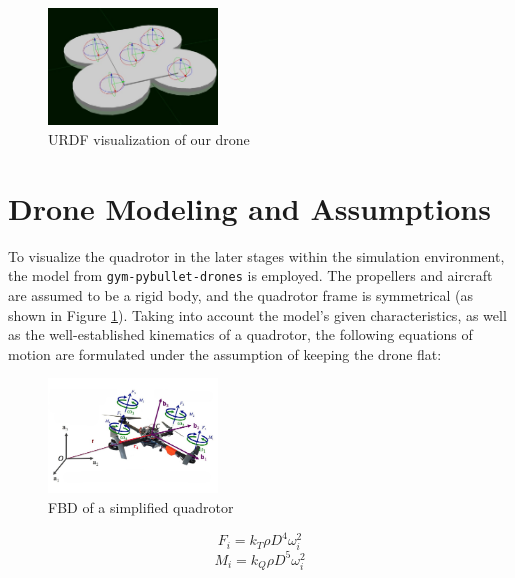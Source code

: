 \documentclass[a4paper, 11pt, conference]{ieeeconf}      %
\begin{document}
\begin{figure}[!h]
    \centering
    \includegraphics[width=0.4\textwidth]{drone_urdf_mockup.jpg}
    \caption{URDF visualization of our drone \cite{mmyself_ros_ardrone}}
    \label{fig:URDF}
\end{figure}

\section{Drone Modeling and Assumptions}
To visualize the quadrotor in the later stages within the simulation environment, the model from \texttt{gym-pybullet-drones} is employed. The propellers and aircraft are assumed to be a rigid body, and the quadrotor frame is symmetrical (as shown in Figure \ref{fig:URDF}). Taking into account the model’s given characteristics, as well as the well-established kinematics of a quadrotor, the following equations of motion are formulated under the assumption of keeping the drone flat:

\begin{figure}[!h]
    \centering
    \includegraphics[width=0.4\textwidth]{mav_model.jpg}
    \caption{FBD of a simplified quadrotor \cite{MAV_Modeling_Control}}
    \label{fig:FBD}
\end{figure}

\begin{equation}
    F_i = k_T \rho D^4 \omega_i^2
    \label{eq:Forces}
\end{equation}
\begin{equation}
    M_i = k_Q \rho D^5 \omega_i^2
    \label{eq:Torques}
\end{equation}
\end{document}
